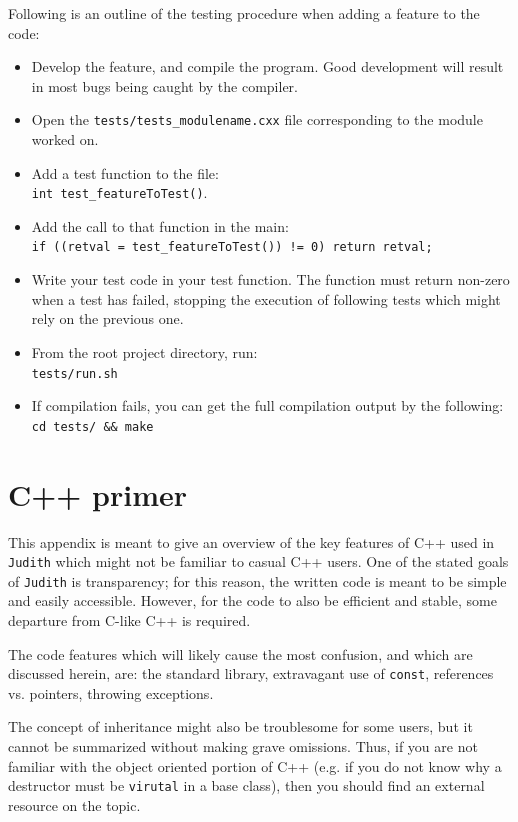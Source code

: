 \documentclass[10pt,a4paper]{book}
\newcommand{\Judith}{\Verb`Judith` }
\begin{document}
Following is an outline of the testing procedure when adding a feature to the code:

\begin{itemize}
	\item Develop the feature, and compile the program. Good development will result in most bugs being caught by the compiler.
	\item Open the \Verb`tests/tests_modulename.cxx` file corresponding to the module worked on.
	\item Add a test function to the file:\\
		  \Verb`int test_featureToTest()`.
	\item Add the call to that function in the main:\\
		  \Verb`if ((retval = test_featureToTest()) != 0) return retval;`
	\item Write your test code in your test function. The function must return non-zero when a test has failed, stopping the execution of following tests which might rely on the previous one.
	\item From the root project directory, run:\\
		  \Verb`tests/run.sh`
	\item If compilation fails, you can get the full compilation output by the following:
		  \Verb`cd tests/ && make`
\end{itemize}

\appendix

\chapter{C++ primer}
\label{ch:cppprimer}

This appendix is meant to give an overview of the key features of C++ used in \Judith which might not be familiar to casual C++ users. One of the stated goals of \Judith is transparency; for this reason, the written code is meant to be simple and easily accessible. However, for the code to also be efficient and stable, some departure from C-like C++ is required.

The code features which will likely cause the most confusion, and which are discussed herein, are: the standard library, extravagant use of \Verb`const`, references vs. pointers, throwing exceptions.

The concept of inheritance might also be troublesome for some users, but it cannot be summarized without making grave omissions. Thus, if you are not familiar with the object oriented portion of C++ (e.g. if you do not know why a destructor must be \Verb`virutal` in a base class), then you should find an external resource on the topic.
\end{document}
